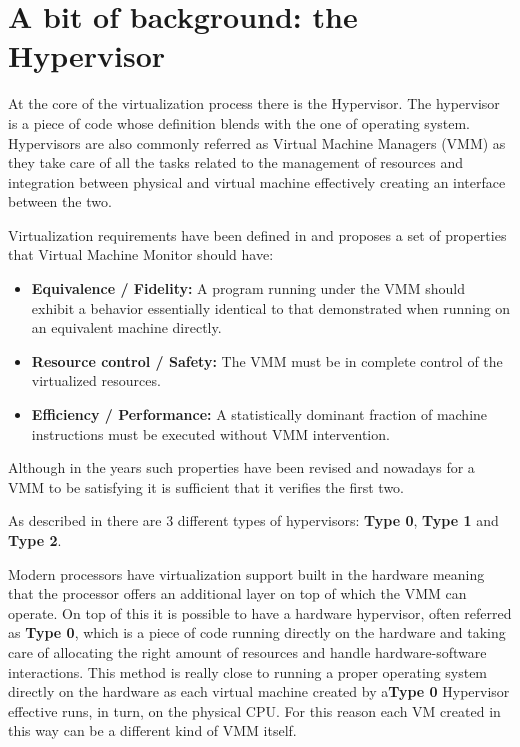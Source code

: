 \section{A bit of background: the Hypervisor}

At the core of the virtualization process there is the Hypervisor. The hypervisor is a piece of code whose definition blends with the one of operating system. Hypervisors are also commonly referred as Virtual Machine Managers (VMM) as they take care of all the tasks related to the management of resources and integration between physical and virtual machine effectively creating an interface between the two.

Virtualization requirements have been defined in \cite{virtreq} and proposes a set of properties that Virtual Machine Monitor should have:

\begin{itemize}
    \item \textbf{Equivalence / Fidelity:} A program running under the VMM should exhibit a behavior essentially identical to that demonstrated when running on an equivalent machine directly.
    \item \textbf{Resource control / Safety:} The VMM must be in complete control of the virtualized resources.
    \item \textbf{Efficiency / Performance:} A statistically dominant fraction of machine instructions must be executed without VMM intervention.
\end{itemize}

Although in the years such properties have been revised and nowadays for a VMM to be satisfying it is sufficient that it verifies the first two. 

As described in\cite{os} there are 3 different types of hypervisors: \textbf{Type 0}, \textbf{Type 1} and \textbf{Type 2}. 

Modern processors have virtualization support built in the hardware meaning that the processor offers an additional layer on top of which the VMM can operate. On top of this it is possible to have a hardware hypervisor, often referred as \textbf{Type 0}, which is a piece of code running directly on the hardware and taking care of allocating the right amount of resources and handle hardware-software interactions. This method is really close to running a proper operating system directly on the hardware as each virtual machine created by a\textbf{Type 0} Hypervisor effective runs, in turn, on the physical CPU. For this reason each VM created in this way can be a different kind of VMM itself.

